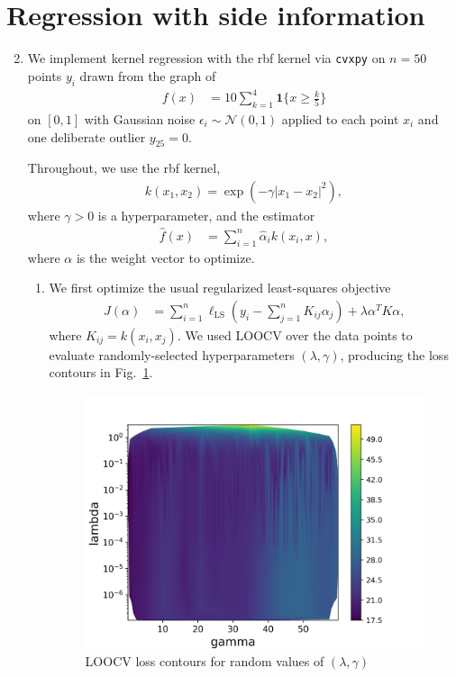 \documentclass[11pt,letterpaper]{article}
\theoremstyle{definition}
\theoremstyle{plain}
\newcommand{\e}{\epsilon}
\numberwithin{equation}{section}
\numberwithin{figure}{section}
\begin{document}
\section{Regression with side information}
\begin{enumerate}
	\setcounter{enumi}{1}
	\item We implement kernel regression with the rbf kernel via \texttt{cvxpy} on $n=50$ points $y_i$ drawn from the graph of
	\begin{align*}
		f(x) &= 10\sum_{k=1}^4 \bm{1}\{x\geq \frac{k}{5}\}
	\end{align*}
	on $[0,1]$ with Gaussian noise $\e_i \sim \mathcal{N}(0,1)$ applied to each point $x_i$ and one deliberate outlier $y_{25} = 0$.

	Throughout, we use the rbf kernel,
	\begin{align*}
		k(x_1,x_2) = \exp(-\gamma|x_1-x_2|^2),
	\end{align*}
	where $\gamma>0$ is a hyperparameter, and the estimator
	\begin{align}
		\hat{f}(x) &= \sum_{i=1}^n \hat{\alpha}_i k(x_i, x),
	\end{align}
	where $\alpha$ is the weight vector to optimize.

	\begin{enumerate}
		\item We first optimize the usual regularized least-squares objective
		\begin{align*}
			J(\alpha) &= \sum_{i=1}^n \ell_\mathrm{LS}\left(y_i - \sum_{j=1}^n K_{ij} \alpha_j\right) + \lambda \alpha^T K \alpha,
		\end{align*}
		where $K_{ij} = k(x_i,x_j)$. We used LOOCV over the data points to evaluate randomly-selected hyperparameters $(\lambda, \gamma)$, producing the loss contours in Fig.~\ref{fig:2a_loocv}.


		\begin{figure}[H]
			\centering
			\includegraphics[width=.6\textwidth]{figures/2a_loocv.png}
			\caption{LOOCV loss contours for random values of $(\lambda, \gamma)$}
			\label{fig:2a_loocv}
		\end{figure}


\end{enumerate}
\end{enumerate}
\end{document}

